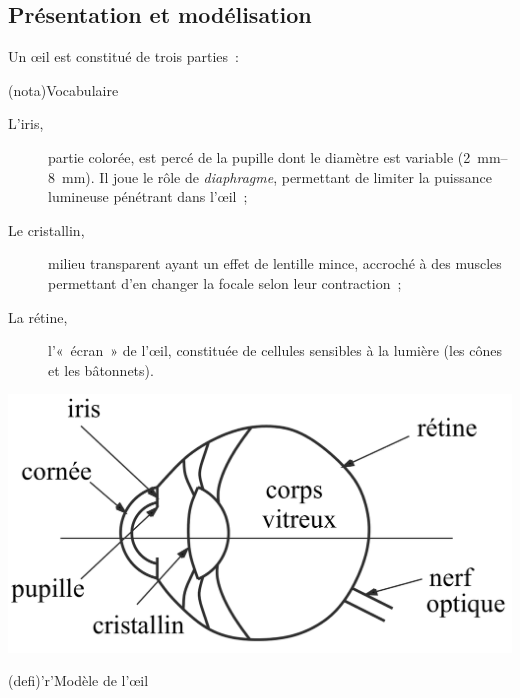\documentclass[../../main/main.tex]{subfiles}
\begin{document}
\subsection{Présentation et modélisation}
Un œil est constitué de trois parties~:\smallbreak
\begin{tcbraster}[raster columns=2, raster equal height=rows]
	\begin{tcb}[label=nota:oeilvoca](nota){Vocabulaire}
		\begin{description}
			\item[L'iris,] partie colorée, est percé de la pupille dont le diamètre est
			      variable (\SIrange{2}{8}{mm}). Il joue le rôle de \textit{diaphragme},
			      permettant de limiter la puissance lumineuse pénétrant dans
			      l'œil~;
			\item[Le cristallin,] milieu transparent ayant un effet de lentille mince,
			      accroché à des muscles permettant d'en changer la focale selon leur
			      contraction~;
			\item[La rétine,] l'«~écran~» de l'œil, constituée de cellules sensibles à
			      la lumière (les cônes et les bâtonnets).
		\end{description}
		\begin{center}
			\includegraphics[width=\linewidth]{oeil_coupe}
			\label{fig:oeil_coupe}
		\end{center}
	\end{tcb}
	\begin{tcb}[label=def:oeil](defi)'r'{Modèle de l'œil}


\end{tcb}
\end{tcbraster}
\end{document}
